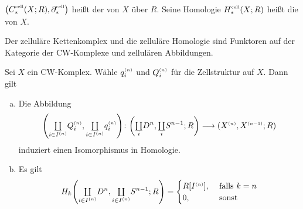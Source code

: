 \begin{definition}[{name=[{Zellulärer Kettenkomplex und zelluläre Homologie}]}]
	$\enbrace*{C_*^\cell(X;R),\partial_*^\cell}$ heißt der  von $X$ über $R$. 
	Seine Homologie $H_*^\cell(X;R)$ heißt die  von $X$.
\end{definition}

Der zelluläre Kettenkomplex und die zelluläre Homologie sind Funktoren auf der Kategorie der CW-Komplexe und zellulären Abbildungen.

\begin{lemma}[{name=[{über $\enbrace{\coprod Q_i^\ssbrace{n}, \coprod q_i^\ssbrace{n}}_* $ und $H_k \enbrace{\coprod_i D^n, \coprod_i S^{n-1};R}$}]},label=lem:124]
	Sei $X$ ein CW-Komplex. Wähle $q_i^{\scriptscriptstyle(n)}$ und $Q_i^{\scriptscriptstyle(n)}$ für die Zellstruktur auf $X$. Dann gilt
	\begin{enumerate}[a)]
		\item Die Abbildung
		\[
			\enbrace*{{\textstyle\coprod\limits_{i \in I^{(n)}}} Q_i^\ssbrace{n}, {\textstyle\coprod\limits_{i \in I^{(n)}}} q_i^\ssbrace{n}} 
			\colon \enbrace*{{\textstyle\coprod\limits_i} D^n, {\textstyle\coprod\limits_i} S^{n-1};R}  \longrightarrow
			\enbrace*{X^\ssbrace{n}, X^\ssbrace{n-1};R} 
		\]
		induziert einen Isomorphismus in Homologie.
		\item Es gilt
		\[
			H_k \enbrace*{{\textstyle\coprod\limits_{i\in I^\ssbrace{n}}} D^n, {\textstyle\coprod\limits_{i\in I^\ssbrace{n}}} S^{n-1};R} = \begin{cases}
				R[I^\ssbrace{n}], &\text{ falls }k=n\\
				0, & \text{ sonst}
			\end{cases}
		\] 
	\end{enumerate}
\end{lemma}
